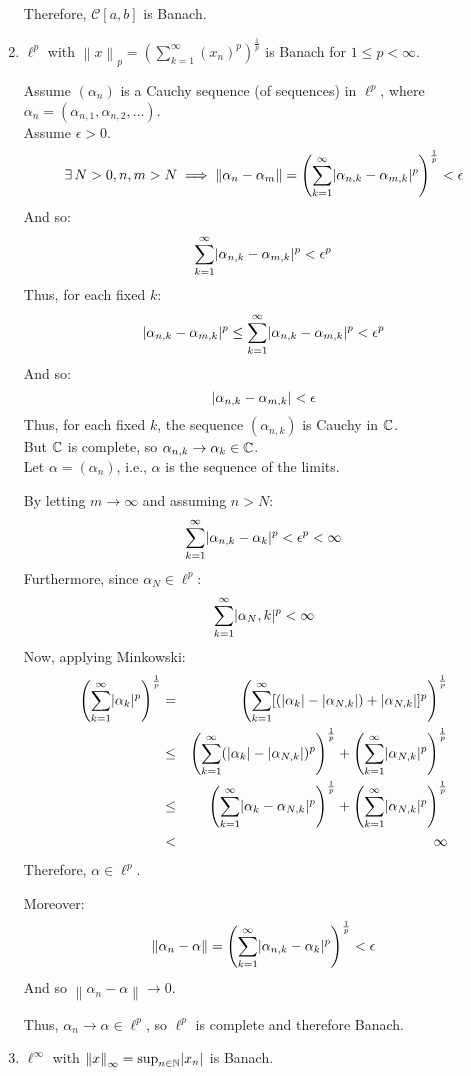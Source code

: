 \documentclass[letterpaper,12pt,fleqn]{article}
\newcommand{\norm}[1]{\left\|#1\right\|}
\newcommand{\mc}{\mathcal{C}}
\renewcommand{\a}{\alpha}
\newcommand{\e}{\epsilon}
\begin{document}
\begin{examples}
\begin{enumerate}
    Therefore, $\mc[a,b]$ is Banach.

  \item $\ell^p$ with
    $\norm{x}_p=\left(\sum_{k=1}^{\infty}(x_n)^p\right)^{\frac{1}{p}}$ is Banach
    for $1\le p<\infty$.

    Assume $(\a_n)$ is a Cauchy sequence (of sequences) in $\ell^p$, where
    $\a_n=(\a_{n,1},\a_{n,2},\ldots)$. \\
    Assume $\e>0$.
    \[\exists\,N>0,n,m>N\implies\norm{\a_n-\a_m}=
    \left(\sum_{k=1}^{\infty}\abs{\a_{n,k}-\a_{m,k}}^p\right)^{\frac{1}{p}}<\e\]
    And so:
    \[\sum_{k=1}^{\infty}\abs{\a_{n,k}-\a_{m,k}}^p<\e^p\]
    Thus, for each fixed $k$:
    \[\abs{\a_{n,k}-\a_{m,k}}^p\le\sum_{k=1}^{\infty}\abs{\a_{n,k}-\a_{m,k}}^p<
    \e^p\]
    And so:
    \[\abs{\a_{n,k}-\a_{m,k}}<\e\]
    Thus, for each fixed $k$, the sequence $(\a_{n,k})$ is Cauchy in $\mathbb{C}$. \\
    But $\mathbb{C}$ is complete, so $\a_{n,k}\to\a_k\in\C$. \\
    Let $\a=(\a_n)$, i.e., $\a$ is the sequence of the limits.

    By letting $m\to\infty$ and assuming $n>N$:
    \[\sum_{k=1}^{\infty}\abs{\a_{n,k}-\a_k}^p<\e^p<\infty\]
    Furthermore, since $\a_N\in\ell^p$:
    \[\sum_{k=1}^{\infty}\abs{\a_N,k}^p<\infty\]
    Now, applying Minkowski:
    \begin{eqnarray*}
      \left(\sum_{k=1}^{\infty}\abs{\a_k}^p\right)^{\frac{1}{p}} &=&
      \left(\sum_{k=1}^{\infty}[(\abs{\a_k}-\abs{\a_{N,k}})+\abs{\a_{N,k}}]^p
      \right)^{\frac{1}{p}} \\
      &\le& \left(\sum_{k=1}^{\infty}(\abs{\a_k}-\abs{\a_{N,k}})^p
      \right)^{\frac{1}{p}}+
      \left(\sum_{k=1}^{\infty}\abs{\a_{N,k}}^p\right)^{\frac{1}{p}} \\
      &\le& \left(\sum_{k=1}^{\infty}\abs{\a_k-\a_{N,k}}^p\right)^{\frac{1}{p}}+
      \left(\sum_{k=1}^{\infty}\abs{\a_{N,k}}^p\right)^{\frac{1}{p}} \\
      &<& \infty
    \end{eqnarray*}
    Therefore, $\a\in\ell^p$.

    Moreover:
    \[\norm{\a_n-\a}=\left(\sum_{k=1}^{\infty}\abs{\a_{n,k}-\a_k}^p
    \right)^{\frac{1}{p}}<\e\]
    And so $\norm{\a_n-\a}\to0$.

    Thus, $\a_n\to\a\in\ell^p$, so $\ell^p$ is complete and therefore Banach.

  \item $\ell^{\infty}$ with $\norm{x}_{\infty}=\sup_{n\in\N}\abs{x_n}$ is
    Banach.


\end{enumerate}
\end{examples}
\end{document}

